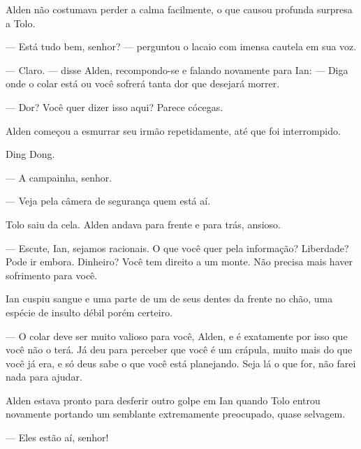 Alden não costumava perder a calma facilmente, o que causou profunda surpresa a
Tolo.

--- Está tudo bem, senhor? --- perguntou o lacaio com imensa cautela em sua
voz.

--- Claro. --- disse Alden, recompondo-se e falando novamente para Ian: ---
Diga onde o colar está ou você sofrerá tanta dor que desejará morrer.

--- Dor? Você quer dizer isso aqui? Parece cócegas.

Alden começou a esmurrar seu irmão repetidamente, até que foi interrompido.

Ding Dong.

--- A campainha, senhor.

--- Veja pela câmera de segurança quem está aí.

Tolo saiu da cela. Alden andava para frente e para trás, ansioso.

--- Escute, Ian, sejamos racionais. O que você quer pela informação? Liberdade?
Pode ir embora. Dinheiro? Você tem direito a um monte. Não precisa mais haver
sofrimento para você.

Ian cuspiu sangue e uma parte de um de seus dentes da frente no chão, uma
espécie de insulto débil porém certeiro.

--- O colar deve ser muito valioso para você, Alden, e é exatamente por isso
que você não o terá. Já deu para perceber que você é um crápula, muito mais do
que você já era, e só deus sabe o que você está planejando. Seja lá o que for,
não farei nada para ajudar.

Alden estava pronto para desferir outro golpe em Ian quando Tolo entrou
novamente portando um semblante extremamente preocupado, quase selvagem.

--- Eles estão aí, senhor!
